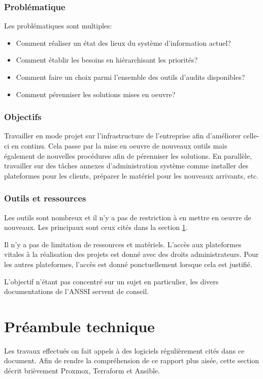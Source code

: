 \documentclass[12pt]{article}
\begin{document}
\subsubsection{Problématique}
Les problématiques sont multiples:
\begin{itemize}
    \item Comment réaliser un état des lieux du système d'information actuel?
    \item Comment établir les besoins en hiérarchisant les priorités?
    \item Comment faire un choix parmi l'ensemble des outils d'audits disponibles?
    \item Comment pérenniser les solutions mises en oeuvre? 
\end{itemize}

\subsubsection{Objectifs}
Travailler en mode projet sur l'infrastructure de l'entreprise afin d'améliorer celle-ci en continu. 
Cela passe par la mise en oeuvre de nouveaux outils mais également de nouvelles procédures afin de pérenniser les solutions. 
En parallèle, travailler sur des tâches annexes d'administration système comme installer des plateformes pour les clients, préparer le matériel pour les nouveaux arrivants, etc.

\subsubsection{Outils et ressources}
Les outils sont nombreux et il n'y a pas de restriction à en mettre en oeuvre de nouveaux. 
Les principaux sont ceux cités dans la section \ref{sec: preambule_technique}.

Il n'y a pas de limitation de ressources et matériels.
L'accès aux plateformes vitales à la réalisation des projets est donné avec des droits administrateurs.
Pour les autres plateformes, l'accès est donné ponctuellement lorsque cela est justifié.

L'objectif n'étant pas concentré sur un sujet en particulier, les divers documentations de l'\gls{ANSSI} servent de conseil.

\newpage
\section{Préambule technique}
\label{sec: preambule_technique}
Les travaux effectués on fait appels à des logiciels régulièrement cités dans ce document. 
Afin de rendre la compréhension de ce rapport plus aisée, cette section décrit brièvement \gls{Proxmox}, Terraform et \gls{Ansible}.
\end{document}
